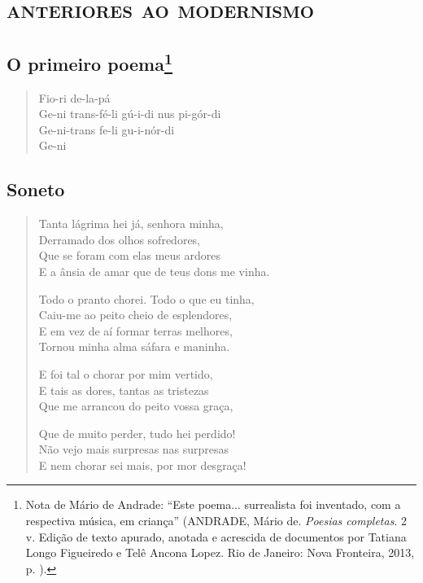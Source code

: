 \part{\textsc{anteriores ao modernismo}}

\chapter{O primeiro poema\footnote[*]{Nota de Mário de Andrade: ``Este
  poema... surrealista foi inventado, com a respectiva música, em
  criança'' (ANDRADE, Mário de. \emph{Poesias completas}. 2 v. Edição de
  texto apurado, anotada e acrescida de documentos por Tatiana Longo
  Figueiredo e Telê Ancona Lopez. Rio de Janeiro: Nova Fronteira, 2013,
  p. ).}}

\begin{verse}
Fio-ri de-la-pá\\
Ge-ni trans-fé-li gú-i-di nus pi-gór-di\\
Ge-ni-trans fe-li gu-i-nór-di\\
Ge-ni
\end{verse}

\chapter{Soneto}

\begin{verse}
Tanta lágrima hei já, senhora minha,\\
Derramado dos olhos sofredores,\\
Que se foram com elas meus ardores\\
E a ânsia de amar que de teus dons me vinha.

Todo o pranto chorei. Todo o que eu tinha,\\
Caiu-me ao peito cheio de esplendores,\\
E em vez de aí formar terras melhores,\\
Tornou minha alma sáfara e maninha.

E foi tal o chorar por mim vertido,\\
E tais as dores, tantas as tristezas\\
Que me arrancou do peito vossa graça,

Que de muito perder, tudo hei perdido!\\
Não vejo mais surpresas nas surpresas\\
E nem chorar sei mais, por mor desgraça!
\end{verse}

